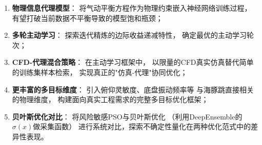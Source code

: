 \begin{enumerate}
    \item \textbf{物理信息代理模型}：
        将气动平衡方程作为物理约束嵌入神经网络训练过程，
        有望打破当前数据不平衡导致的模型饱和瓶颈；
    \item \textbf{多轮主动学习}：
        探索迭代精炼的边际收益递减特性，
        确定最优的主动学习轮次；
    \item \textbf{CFD-代理混合策略}：
        在主动学习框架中，
        以限量的CFD真实仿真替代简单的训练集样本检索，
        实现真正的"仿真-代理"协同优化；
    \item \textbf{更丰富的多目标维度}：
        引入俯仰灵敏度、底盘振动频率等
        与海豚跳直接相关的物理维度，
        构建面向真实工程需求的完整多目标优化框架；
    \item \textbf{贝叶斯优化对比}：
        将风险敏感PSO与贝叶斯优化
        （利用DeepEnsemble的$\sigma(x)$做采集函数）
        进行系统对比，探索不确定性量化在两种优化范式中的差异性表现。
\end{enumerate}
